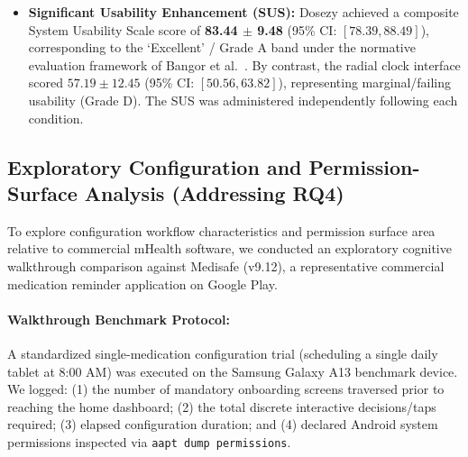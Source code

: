 \documentclass[11pt,a4paper]{article}
\begin{document}
\begin{itemize}[leftmargin=*]
    \item \textbf{Significant Usability Enhancement (SUS):} Dosezy achieved a composite System Usability Scale score of \textbf{83.44 $\pm$ 9.48} (95\% CI: $[78.39, 88.49]$), corresponding to the `Excellent' / Grade A band under the normative evaluation framework of Bangor et al.~\cite{bangor2008empirical,lewis2009factor}. By contrast, the radial clock interface scored $57.19 \pm 12.45$ (95\% CI: $[50.56, 63.82]$), representing marginal/failing usability (Grade D). The SUS was administered independently following each condition.
\end{itemize}

\subsection{Exploratory Configuration and Permission-Surface Analysis (Addressing RQ4)}
\label{sec:commercial_comparison}

To explore configuration workflow characteristics and permission surface area relative to commercial mHealth software, we conducted an exploratory cognitive walkthrough comparison against Medisafe (v9.12), a representative commercial medication reminder application on Google Play.

\paragraph{Walkthrough Benchmark Protocol:}
A standardized single-medication configuration trial (scheduling a single daily tablet at 8:00 AM) was executed on the Samsung Galaxy A13 benchmark device. We logged: (1) the number of mandatory onboarding screens traversed prior to reaching the home dashboard; (2) the total discrete interactive decisions/taps required; (3) elapsed configuration duration; and (4) declared Android system permissions inspected via \texttt{aapt dump permissions}.
\end{document}
